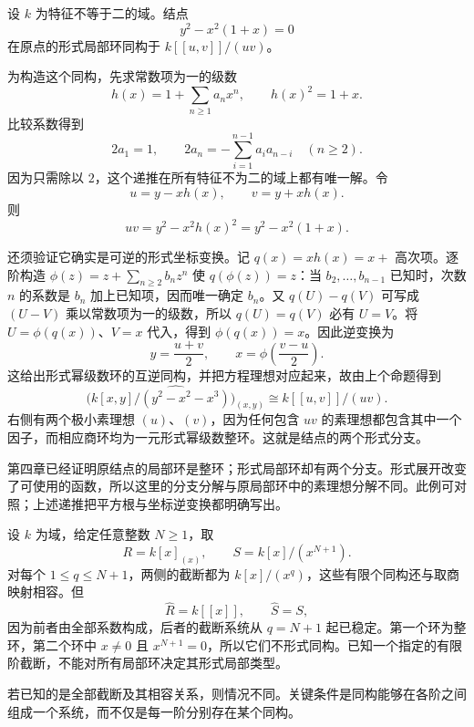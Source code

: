 \begin{example}
\label{g5:exm:formal-node}
	设 \(k\) 为特征不等于二的域。结点
	\[
		y^2-x^2(1+x)=0
	\]
	在原点的形式局部环同构于 \(k[[u,v]]/(uv)\)。

	为构造这个同构，先求常数项为一的级数
	\[
		h(x)=1+\sum_{n\geq1}a_nx^n,\qquad h(x)^2=1+x.
	\]
	比较系数得到
	\[
		2a_1=1,\qquad
		2a_n=-\sum_{i=1}^{n-1}a_i a_{n-i}\quad(n\geq2).
	\]
	因为只需除以 \(2\)，这个递推在所有特征不为二的域上都有唯一解。令
	\[
		u=y-xh(x),\qquad v=y+xh(x).
	\]
	则
	\[
		uv=y^2-x^2h(x)^2=y^2-x^2(1+x).
	\]

	还须验证它确实是可逆的形式坐标变换。记 \(q(x)=xh(x)=x+\) 高次项。逐阶构造
	\(\phi(z)=z+\sum_{n\geq2}b_nz^n\)
	使 \(q(\phi(z))=z\)：当 \(b_2,\ldots,b_{n-1}\) 已知时，次数 \(n\) 的系数是 \(b_n\) 加上已知项，因而唯一确定 \(b_n\)。又 \(q(U)-q(V)\) 可写成 \((U-V)\) 乘以常数项为一的级数，所以 \(q(U)=q(V)\) 必有 \(U=V\)。将 \(U=\phi(q(x))\)、\(V=x\) 代入，得到 \(\phi(q(x))=x\)。因此逆变换为
	\[
		y=\frac{u+v}{2},\qquad
		x=\phi\left(\frac{v-u}{2}\right).
	\]
	这给出形式幂级数环的互逆同构，并把方程理想对应起来，故由上个命题得到
	\[
		\widehat{\bigl(k[x,y]/(y^2-x^2-x^3)\bigr)_{(x,y)}}
		\cong k[[u,v]]/(uv).
	\]
	右侧有两个极小素理想 \((u)\)、\((v)\)，因为任何包含 \(uv\) 的素理想都包含其中一个因子，而相应商环均为一元形式幂级数整环。这就是结点的两个形式分支。
\end{example}

第四章已经证明原结点的局部环是整环；形式局部环却有两个分支。形式展开改变了可使用的函数，所以这里的分支分解与原局部环中的素理想分解不同。此例可对照\cite[第I章，第5节，例5.6.3，第34--35页]{Hartshorne1977}；上述递推把平方根与坐标逆变换都明确写出。

\begin{example}
\label{g5:exm:finite-truncation-not-formal-type}
	设 \(k\) 为域，给定任意整数 \(N\geq1\)，取
	\[
		R=k[x]_{(x)},\qquad S=k[x]/(x^{N+1}).
	\]
	对每个 \(1\leq q\leq N+1\)，两侧的截断都为 \(k[x]/(x^q)\)，这些有限个同构还与取商映射相容。但
	\[
		\widehat R=k[[x]],\qquad \widehat S=S,
	\]
	因为前者由全部系数构成，后者的截断系统从 \(q=N+1\) 起已稳定。第一个环为整环，第二个环中 \(x\ne0\) 且 \(x^{N+1}=0\)，所以它们不形式同构。已知一个指定的有限阶截断，不能对所有局部环决定其形式局部类型。
\end{example}

若已知的是全部截断及其相容关系，则情况不同。关键条件是同构能够在各阶之间组成一个系统，而不仅是每一阶分别存在某个同构。

